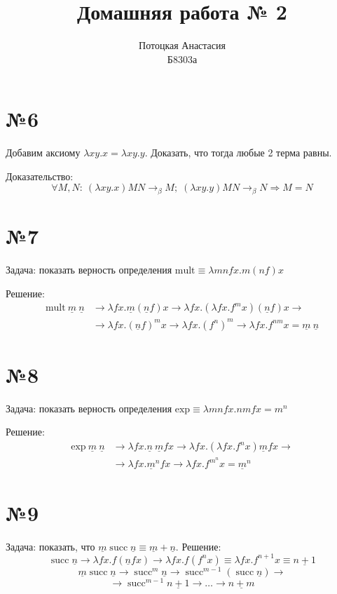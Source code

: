 \documentclass[a4paper,14pt]{scrreprt}
\title{Домашняя работа № 2}
\author{Потоцкая Анастасия\\Б8303а}
\newcommand{\lmd}{\lambda}
\newcommand{\un}{\underline}
\DeclareMathOperator{\msucc}{succ}
\begin{document}
\maketitle

\section*{№6}
Добавим аксиому $\lmd xy.x=\lmd xy.y$. Доказать, что тогда любые 2 терма равны.

Доказательство: 
	$$ \forall M,N: \ (\lmd xy.x)MN \to_\beta M; \; (\lmd xy.y)MN \to_\beta N \Rightarrow M = N$$

\section*{№7}
Задача: показать верность определения $\text{mult}\equiv\lmd mnfx.m(nf)x$

Решение:
\begin{align*}
	\text{mult}\ \un{m} \ \un{n} &\to \lmd fx.\un{m}(\un{n}f)x \to \lmd fx.(\lmd fx.f^m x)(\un{n}f)x\to\\
	&\to\lmd fx.(\un{n}f)^m x\to \lmd fx.(f^n)^m \to \lmd fx. f^{nm} x= \un{m} \ \un{n}
\end{align*}

\section*{№8}
Задача: показать верность определения $\text{exp}\equiv\lmd mnfx.nmfx=m^n$

Решение:
\begin{align*}
\text{exp}\ \un{m}\ \un{n} &\to \lmd fx.\un{n} \ \un{m}fx\to \lmd fx.(\lmd fx.f^nx)\un{m}fx\to\\
&\to \lmd fx.\un{m}^nfx \to \lmd fx.f^{m^n}x=\un{m}^n
\end{align*}

\section*{№9}
Задача: показать, что $ \un{m} \msucc \un{n} \equiv  \un{m} + \un{n}$.
Решение:
$$ \msucc \un{n} \to \lmd fx.f(\un{n}fx) \to \lmd fx.f(f^nx) \equiv \lmd fx.f^{n+1}x \equiv \un{n+1}$$
$$ \un{m} \msucc \un{n} \to \msucc^{m} \un{n} \to \msucc^{m-1}(\msucc \un{n}) \to $$
$$ \to \msucc^{m-1} \un{n + 1} \to \dots \to \un{n+m} $$
\end{document}

